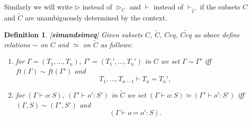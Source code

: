 \documentclass[11pt]{article}
\newtheorem{definition}[proposition]{Definition}
\newcommand{\llabel}[1]{\label{#1}[{\bf #1}]}
\newcommand{\wt}{\widetilde}
\begin{document}
Similarly we will write $\rhd$ instead of $\rhd_C$ and $\vdash$ instead of $\vdash_{\wt{C}}$ if the subsets $C$ and $\wt{C}$ are unambiguously  determined by the context.  

%
\begin{definition}
\llabel{simandsimeq}
Given subsets $C$, $\wt{C}$, $Ceq$, $\wt{Ceq}$ as above define relations $\sim$ on $C$ and $\simeq$ on $\wt{C}$ as follows:
%
\begin{enumerate}
\item for $\Gamma=(T_1,\dots,T_n)$, $\Gamma'=(T_1',\dots,T_n')$ in $C$ we set  $\Gamma\sim\Gamma'$ iff $ft(\Gamma)\sim ft(\Gamma')$ and 
%
$$T_1,\dots,T_{n-1}\vdash T_n=T_n',$$
\item for $(\Gamma\vdash o:S)$, $(\Gamma'\vdash o':S')$ in $\wt{C}$ we set $(\Gamma\vdash o:S)\simeq(\Gamma'\vdash o':S')$ iff $(\Gamma,S)\sim(\Gamma',S')$ and 
%
$$(\Gamma\vdash o=o':S).$$
\end{enumerate}
\end{definition}
%
\end{document}
